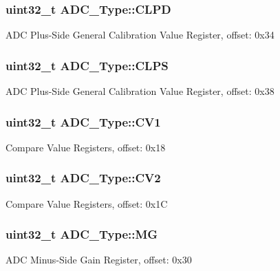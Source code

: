 \subsubsection[{\texorpdfstring{C\+L\+PD}{CLPD}}]{ uint32\+\_\+t A\+D\+C\+\_\+\+Type\+::\+C\+L\+PD}\hypertarget{structADC__Type_af713fff7638ff0895a2f3096c292380b}{}\label{structADC__Type_af713fff7638ff0895a2f3096c292380b}
A\+DC Plus-\/\+Side General Calibration Value Register, offset\+: 0x34 
\subsubsection[{\texorpdfstring{C\+L\+PS}{CLPS}}]{ uint32\+\_\+t A\+D\+C\+\_\+\+Type\+::\+C\+L\+PS}\hypertarget{structADC__Type_a7bac5a0a1385b76292e97a48d04448bb}{}\label{structADC__Type_a7bac5a0a1385b76292e97a48d04448bb}
A\+DC Plus-\/\+Side General Calibration Value Register, offset\+: 0x38 
\subsubsection[{\texorpdfstring{C\+V1}{CV1}}]{ uint32\+\_\+t A\+D\+C\+\_\+\+Type\+::\+C\+V1}\hypertarget{structADC__Type_ac8a4d66d82362aab14f46b3a2947a7b7}{}\label{structADC__Type_ac8a4d66d82362aab14f46b3a2947a7b7}
Compare Value Registers, offset\+: 0x18 
\subsubsection[{\texorpdfstring{C\+V2}{CV2}}]{ uint32\+\_\+t A\+D\+C\+\_\+\+Type\+::\+C\+V2}\hypertarget{structADC__Type_aca49bcd5d7bc64184e106decf4e7f750}{}\label{structADC__Type_aca49bcd5d7bc64184e106decf4e7f750}
Compare Value Registers, offset\+: 0x1C 
\subsubsection[{\texorpdfstring{MG}{MG}}]{ uint32\+\_\+t A\+D\+C\+\_\+\+Type\+::\+MG}\hypertarget{structADC__Type_a2487601e623b6a7c31149b068d9aefca}{}\label{structADC__Type_a2487601e623b6a7c31149b068d9aefca}
A\+DC Minus-\/\+Side Gain Register, offset\+: 0x30 
